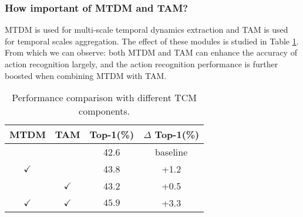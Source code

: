 \documentclass[journal]{IEEEtran}
\begin{document}
\subsubsection{How important of MTDM and TAM?}
MTDM is used for multi-scale temporal dynamics extraction and TAM is used for temporal scales aggregation. The effect of these modules is studied in Table \ref{tab:mtdm-tam}. From which we can observe: both MTDM and TAM can enhance the accuracy of action recognition largely, and the action recognition performance is further boosted when combining MTDM with TAM.
\begin{table}[!ht]
\centering
\caption{Performance comparison with different TCM components.}
\label{tab:mtdm-tam}
\begin{tabular}{ccc|c}
\hline MTDM & TAM &  Top-1(\%) & $\Delta$ Top-1(\%) \\ \hline
 & & 42.6 & baseline \\ \hline
 $\checkmark$ & & 43.8 & +1.2 \\
  & $\checkmark$ & 43.2 & +0.5 \\
 $\checkmark$ & $\checkmark$ & $\mathbf{45.9}$ & +3.3 \\ \hline
\end{tabular}
\end{table}
\end{document}
